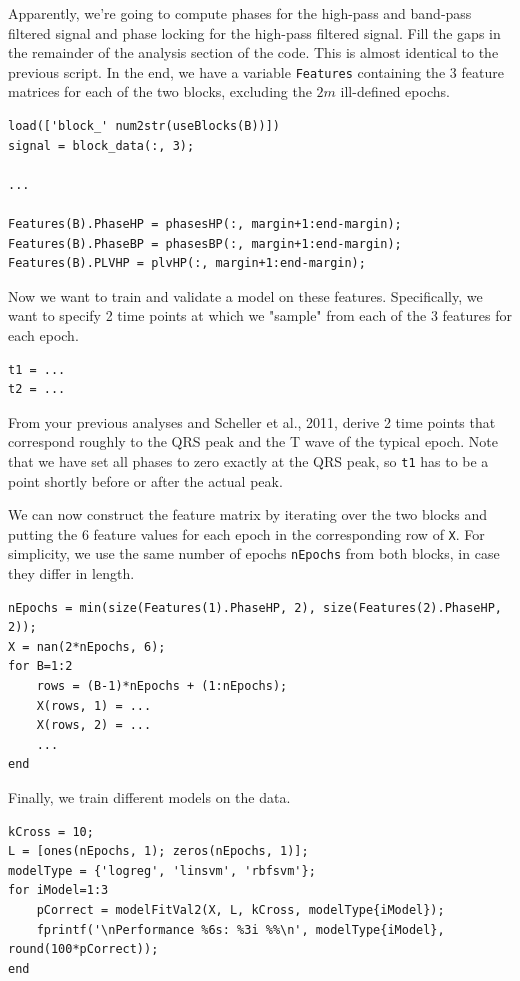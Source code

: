 \documentclass[10pt,a4paper,notitlepage]{report}
\begin{document}
Apparently, we're going to compute phases for the high-pass and band-pass filtered signal and phase locking for the high-pass filtered signal. Fill the gaps in the remainder of the analysis section of the code. This is almost identical to the previous script. In the end, we have a variable \texttt{Features} containing the 3 feature matrices for each of the two blocks, excluding the $2m$ ill-defined epochs.

\begin{verbatim}
load(['block_' num2str(useBlocks(B))])
signal = block_data(:, 3);

...

Features(B).PhaseHP = phasesHP(:, margin+1:end-margin);
Features(B).PhaseBP = phasesBP(:, margin+1:end-margin);
Features(B).PLVHP = plvHP(:, margin+1:end-margin);
\end{verbatim}

Now we want to train and validate a model on these features. Specifically, we want to specify 2 time points at which we "sample" from each of the 3 features for each epoch.

\begin{verbatim}
t1 = ...
t2 = ...
\end{verbatim}

From your previous analyses and Scheller et al., 2011, derive 2 time points that correspond roughly to the QRS peak and the T wave of the typical epoch. Note that we have set all phases to zero exactly at the QRS peak, so \texttt{t1} has to be a point shortly before or after the actual peak.

We can now construct the feature matrix by iterating over the two blocks and putting the 6 feature values for each epoch in the corresponding row of \texttt{X}. For simplicity, we use the same number of epochs \texttt{nEpochs} from both blocks, in case they differ in length.

\begin{verbatim}
nEpochs = min(size(Features(1).PhaseHP, 2), size(Features(2).PhaseHP, 2));
X = nan(2*nEpochs, 6);
for B=1:2
    rows = (B-1)*nEpochs + (1:nEpochs);
    X(rows, 1) = ...
    X(rows, 2) = ...
    ...
end
\end{verbatim}

Finally, we train different models on the data.

\begin{verbatim}
kCross = 10;
L = [ones(nEpochs, 1); zeros(nEpochs, 1)];
modelType = {'logreg', 'linsvm', 'rbfsvm'};
for iModel=1:3
    pCorrect = modelFitVal2(X, L, kCross, modelType{iModel});
    fprintf('\nPerformance %6s: %3i %%\n', modelType{iModel}, round(100*pCorrect));
end
\end{verbatim}
\end{document}
